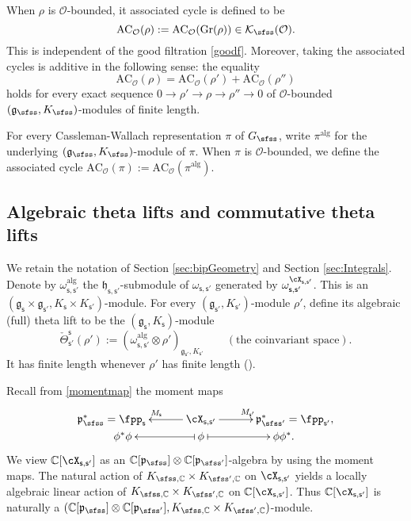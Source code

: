 \documentclass[12pt,a4paper]{amsart}
\newcommand{\CK}{{\mathcal {K}}}
\newcommand{\CO}{{\mathcal {O}}}
\newcommand{\oS}{\operatorname{S}}
\newcommand{\g}{\mathfrak g}
\newcommand{\h}{\mathfrak h}
\newcommand{\p}{\mathfrak p}
\numberwithin{equation}{section}
\theoremstyle{remark}
\begin{document}
When $\rho$ is  $\CO$-bounded, it associated cycle is defined to be
\[
   \mathrm{AC}_\CO(\rho):= \mathrm{AC}_\CO(\mathrm{Gr}(\rho))\in  \CK_\sfss(\CO).
\]
This is independent of the good filtration \eqref{goodf}. Moreover, taking the associated cycles is additive in the following sense: the equality
\[
 \mathrm{AC}_\CO(\rho)= \mathrm{AC}_\CO(\rho')+ \mathrm{AC}_\CO(\rho'')
\]
holds for every exact sequence
$0\rightarrow \rho'\rightarrow \rho\rightarrow \rho''\rightarrow 0$ of  $\CO$-bounded  $(\g_\sfss, K_{\sfss})$-modules of finite length.

For every Cassleman-Wallach representation $\pi$ of $G_\sfss$, write $\pi^{\mathrm{alg}}$ for the underlying $(\g_\sfss, K_\sfss)$-module of $\pi$. When $\pi$ is $\CO$-bounded, we define the associated cycle $\mathrm{AC}_\CO(\pi):=\mathrm{AC}_\CO(\pi^{\mathrm{alg}})$.


\subsection{Algebraic theta lifts and commutative theta lifts}


We retain the notation of Section \ref{sec:bipGeometry} and Section \ref{sec:Integrals}.
Denote by $\omega^{\mathrm{alg}}_{\mathsf s, \mathsf s'}$ the $\h_{\mathsf s, \mathsf s'}$-submodule of $\omega_{\mathsf s, \mathsf s'}$ generated by  $ \omega_{\mathsf s, \mathsf s'}^{\cX_{\mathsf s, \mathsf s'}}$. This is an $(\g_\mathsf s\times \g_{\mathsf s'}, K_\mathsf s\times K_{\mathsf s'})$-module. For every $ (\g_{\mathsf s'}, K_{\mathsf s'})$-module $\rho'$, define its algebraic (full) theta lift to be the $(\g_{\mathsf s}, K_{\mathsf s})$-module
\[
   \check \Theta_{\mathsf s'}^{\mathsf s}(\rho'):=(\omega^{\mathrm{alg}}_{\mathsf s, \mathsf s'}\otimes \rho')_{\g_{\mathsf s'}, K_{\mathsf s'}} \qquad (\textrm{the  coinvariant space}).
\]
It has finite length whenever $\rho'$ has finite length (\cite[Section 4]{Howe89}).



Recall from \eqref{momentmap} the moment maps
  \[
    \xymatrix@R=0em@C=3.0em{
     \p_\sfss^*=\fpp_\mathsf s &\ar[l]_{M_\mathsf s} \cX_{\mathsf s, \mathsf s'}\ar[r]^{M_{\mathsf s'}}& \p_{\sfss'}^*=\fpp_{\mathsf s'},\\
    \qquad \phi^* \phi  &\ar@{|->}[l] \phi \ar@{|->}[r] & \phi \phi^*.\qquad
    }
  \]
We view $\C[\cX_{\mathsf s, \mathsf s'}]$ as an $\C[\p_\sfss]\otimes \C[\p_{\sfss'}]$-algebra by using the moment maps. The natural action of $K_{\sfss,\C}\times K_{\sfss',\C}$ on $\cX_{\mathsf s, \mathsf s'}$ yields a locally algebraic linear action of  $K_{\sfss,\C}\times K_{\sfss',\C}$ on $\C[\cX_{\mathsf s, \mathsf s'}]$. Thus $\C[\cX_{\mathsf s, \mathsf s'}]$  is naturally a  $(\C[\p_{\sfss}]\otimes \C[\p_{\sfss'}], K_{\sfss, \C}\times K_{\sfss', \C})$-module.
\end{document}
